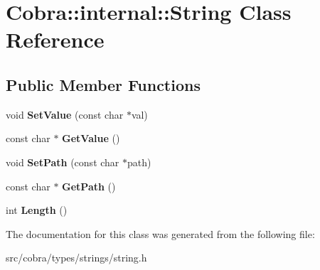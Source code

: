 \hypertarget{class_cobra_1_1internal_1_1_string}{\section{Cobra\+:\+:internal\+:\+:String Class Reference}
\label{class_cobra_1_1internal_1_1_string}
}
\subsection*{Public Member Functions}
\begin{DoxyCompactItemize}
\item 
\hypertarget{class_cobra_1_1internal_1_1_string_a3b71e1d8e3fa402e5b5f9c003438ca22}{void {\bfseries Set\+Value} (const char $\ast$val)}\label{class_cobra_1_1internal_1_1_string_a3b71e1d8e3fa402e5b5f9c003438ca22}

\item 
\hypertarget{class_cobra_1_1internal_1_1_string_a728f1e162a43a7b3c7261b477de7d197}{const char $\ast$ {\bfseries Get\+Value} ()}\label{class_cobra_1_1internal_1_1_string_a728f1e162a43a7b3c7261b477de7d197}

\item 
\hypertarget{class_cobra_1_1internal_1_1_string_af051b388ccb8fbd0816062bbce072507}{void {\bfseries Set\+Path} (const char $\ast$path)}\label{class_cobra_1_1internal_1_1_string_af051b388ccb8fbd0816062bbce072507}

\item 
\hypertarget{class_cobra_1_1internal_1_1_string_ade3cf71da3c0c32ebfd076e12b1d21bf}{const char $\ast$ {\bfseries Get\+Path} ()}\label{class_cobra_1_1internal_1_1_string_ade3cf71da3c0c32ebfd076e12b1d21bf}

\item 
\hypertarget{class_cobra_1_1internal_1_1_string_ad2f8be7ec1cff02df6982b734c5f5c57}{int {\bfseries Length} ()}\label{class_cobra_1_1internal_1_1_string_ad2f8be7ec1cff02df6982b734c5f5c57}

\end{DoxyCompactItemize}


The documentation for this class was generated from the following file\+:\begin{DoxyCompactItemize}
\item 
src/cobra/types/strings/string.\+h\end{DoxyCompactItemize}
